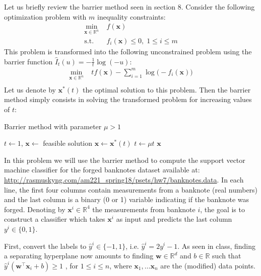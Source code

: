 \documentclass[11pt]{article}
\newcommand{\eps}{\varepsilon}
\theoremstyle{remark}
\newcommand{\R}{\mathbb{R}}                     %
\newcommand{\bx}{\mathbf{x}}
\newcommand{\bw}{\mathbf{w}}
\begin{document}
Let us briefly review the barrier method seen in section 8. Consider the
following optimization problem with $m$ inequality constraints:
\begin{displaymath}
\begin{aligned}
    \min_{\bx\in\R^n} &\;f(\bx)\\
    \text{s.t.}&\; f_i(\bx)\leq 0,\; 1\leq i\leq m
\end{aligned}
\end{displaymath}
This problem is transformed into the following unconstrained problem using the
barrier function $\hat{I}_t(u) = -\frac{1}{t}\log (-u)$:
\begin{displaymath}
\begin{aligned}
    \min_{\bx\in\R^n} &\; t f(\bx) - \sum_{i=1}^m \log\big(-f_i(\bx)\big)\\
\end{aligned}
\end{displaymath}
Let us denote by $\bx^*(t)$ the optimal solution to this problem. Then the
barrier method simply consists in solving the transformed problem for
increasing values of $t$:

\begin{algorithm}
    \caption{Barrier method with parameter $\mu > 1$}
    \label{alg:bls}
    \begin{algorithmic}[1]
        \STATE $t\gets 1$, $\bx\gets$ feasible solution
        \WHILE{$\frac{m}{t}\geq \eps$}
        \STATE $\bx\gets \bx^*(t)$ \quad 
            \STATE $t\gets \mu t$
        \ENDWHILE
        \RETURN $\bx$
    \end{algorithmic}
\end{algorithm}

In this problem we will use the barrier method to compute the support vector
machine classifier for the forged banknotes dataset available at:
\url{http://rasmuskyng.com/am221_spring18/psets/hw7/banknotes.data}.
In each line, the first four columns contain measurements from a banknote (real numbers) and the last column
is a binary (0 or 1) variable indicating if the banknote was forged. Denoting
by $\bx^i\in\R^4$ the measurements from banknote $i$, the goal is to construct
a classifier which takes $\bx^i$ as input and predicts the last column
$y^i\in\{0, 1\}$.

First, convert the labels to $\hat{y}^i\in\{-1, 1\}$, i.e. $\hat{y}^i
= 2y^i - 1$.
%
As seen in class, finding a separating hyperplane now amounts to
finding $\bw\in\R^d$ and $b \in \R$ such that
$\hat{y}^i (\bw^\intercal\bx_i +b)\geq 1$ , for $1\leq i\leq n$, where $\bx_1,\dots\bx_n$ are
the (modified) data points.
\end{document}
